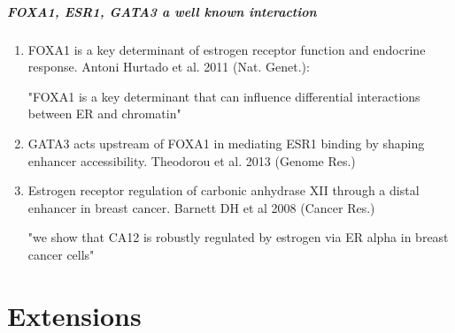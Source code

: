 \documentclass[10pt, c, xcolor=x11names]{beamer}\usepackage[]{graphicx}\usepackage[]{color}
\begin{document}
\begin{frame}[fragile]
  \frametitle{FOXA1, ESR1, GATA3 a well known interaction}

\begin{enumerate}
\item FOXA1 is a key determinant of estrogen receptor function and endocrine response. Antoni Hurtado et al. 2011 (Nat. Genet.):

    \rsa "FOXA1 is a key determinant that can influence differential interactions between ER and chromatin"

\item GATA3 acts upstream of FOXA1 in mediating ESR1 binding by shaping enhancer accessibility. Theodorou et al. 2013 (Genome Res.)

\item Estrogen receptor regulation of carbonic anhydrase XII through a distal enhancer in breast cancer.
Barnett DH et al 2008 (Cancer Res.)
    
    \rsa "we show that CA12 is robustly regulated by estrogen via ER alpha in breast cancer cells"
\end{enumerate}

\end{frame}


\part<presentation>{Extensions}
\begin{frame}
  \partpage
  \tableofcontents[hideallsubsections]
\end{frame}
\end{document}
